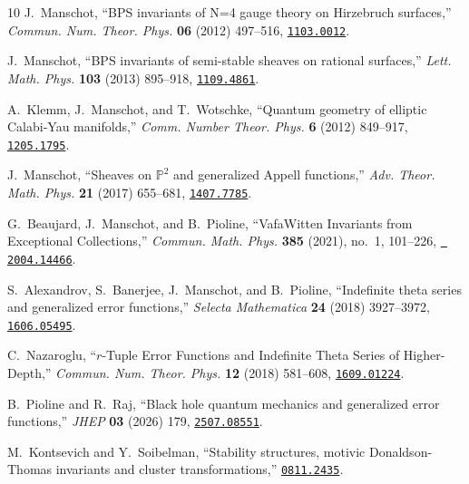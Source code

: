 \documentclass[12pt,letterpaper]{JHEP3}
\begin{document}
\begin{thebibliography}{10}
	J.~Manschot, ``{BPS invariants of N=4 gauge theory on Hirzebruch surfaces},''
	{\em Commun. Num. Theor. Phys.} {\bf 06} (2012) 497--516,
	\href{http://www.arXiv.org/abs/1103.0012}{{\tt 1103.0012}}.
	
	J.~Manschot, ``{BPS invariants of semi-stable sheaves on rational surfaces},''
	{\em Lett. Math. Phys.} {\bf 103} (2013) 895--918,
	\href{http://www.arXiv.org/abs/1109.4861}{{\tt 1109.4861}}.
	
	A.~Klemm, J.~Manschot, and T.~Wotschke, ``{Quantum geometry of elliptic
		Calabi-Yau manifolds},'' {\em Comm. Number Theor. Phys.} {\bf 6} (2012)
	849--917,
	\href{http://www.arXiv.org/abs/1205.1795}{{\tt 1205.1795}}.
	
	J.~Manschot, ``{Sheaves on $\mathds{P}^2$ and generalized Appell functions},''
	{\em Adv. Theor. Math. Phys.} {\bf 21} (2017) 655--681,
	\href{http://www.arXiv.org/abs/1407.7785}{{\tt 1407.7785}}.
	
	G.~Beaujard, J.~Manschot, and B.~Pioline, ``{Vafa\textendash{}Witten Invariants
		from Exceptional Collections},'' {\em Commun. Math. Phys.} {\bf 385} (2021),
	no.~1, 101--226, \href{http://www.arXiv.org/abs/2004.14466}{{\tt
			2004.14466}}.
	
	S.~Alexandrov, S.~Banerjee, J.~Manschot, and B.~Pioline, ``{Indefinite theta
		series and generalized error functions},'' {\em Selecta Mathematica} {\bf 24}
	(2018) 3927--3972,
	\href{http://www.arXiv.org/abs/1606.05495}{{\tt 1606.05495}}.
	
	C.~Nazaroglu, ``{$r$-Tuple Error Functions and Indefinite Theta Series of
		Higher-Depth},'' {\em Commun. Num. Theor. Phys.} {\bf 12} (2018) 581--608,
	\href{http://www.arXiv.org/abs/1609.01224}{{\tt 1609.01224}}.
	
	B.~Pioline and R.~Raj, ``{Black hole quantum mechanics and generalized error
		functions},'' {\em JHEP} {\bf 03} (2026) 179,
	\href{http://www.arXiv.org/abs/2507.08551}{{\tt 2507.08551}}.
	
	M.~Kontsevich and Y.~Soibelman, ``{Stability structures, motivic
		Donaldson-Thomas invariants and cluster transformations},''
	\href{http://www.arXiv.org/abs/0811.2435}{{\tt 0811.2435}}.
	

\end{thebibliography}
\end{document}
